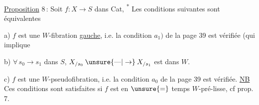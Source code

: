 
\uline{Proposition} 8\,: Soit $f\colon X\longrightarrow S$ dans Cat,  \textsuperscript{*}
Les conditions suivantes sont équivalentes

a) $f$ est une $W$-fibration \uline{gauche}, i.e. la condition $a_1)$ de la page 39 est vérifiée (qui implique

b)  $\forall\,s_0\to s_1$ dans $S$, $X_{/s_0}\mathbin{\unsure{\text{---}|\to}}X_{/s_1}$ est dans $W$.

c) $f$  est une $W$-pseudofibration, i.e. la condition $a_0$ de la page 39 est vérifiée.
\uline{NB} Ces conditions sont satisfaites si $f$ est en $\unsure{=}$ temps $W$-pré-lisse, cf prop. 7.

